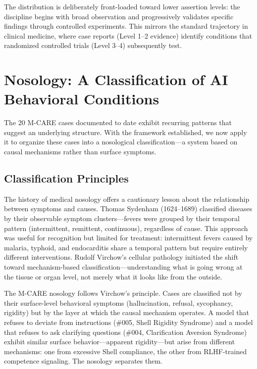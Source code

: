 \documentclass[11pt]{article}
\begin{document}
The distribution is deliberately front-loaded toward lower assertion levels: the discipline begins with broad observation and progressively validates specific findings through controlled experiments. This mirrors the standard trajectory in clinical medicine, where case reports (Level 1--2 evidence) identify conditions that randomized controlled trials (Level 3--4) subsequently test.

\section{Nosology: A Classification of AI Behavioral Conditions}

The 20 M-CARE cases documented to date exhibit recurring patterns that suggest an underlying structure. With the framework established, we now apply it to organize these cases into a nosological classification---a system based on causal mechanisms rather than surface symptoms.

\subsection{Classification Principles}

The history of medical nosology offers a cautionary lesson about the relationship between symptoms and causes. Thomas Sydenham (1624--1689) classified diseases by their observable symptom clusters---fevers were grouped by their temporal pattern (intermittent, remittent, continuous), regardless of cause. This approach was useful for recognition but limited for treatment: intermittent fevers caused by malaria, typhoid, and endocarditis share a temporal pattern but require entirely different interventions. Rudolf Virchow's cellular pathology \citep{Virchow1858} initiated the shift toward mechanism-based classification---understanding what is going wrong at the tissue or organ level, not merely what it looks like from the outside.

The M-CARE nosology follows Virchow's principle. Cases are classified not by their surface-level behavioral symptoms (hallucination, refusal, sycophancy, rigidity) but by the layer at which the causal mechanism operates. A model that refuses to deviate from instructions (\#005, Shell Rigidity Syndrome) and a model that refuses to ask clarifying questions (\#004, Clarification Aversion Syndrome) exhibit similar surface behavior---apparent rigidity---but arise from different mechanisms: one from excessive Shell compliance, the other from RLHF-trained competence signaling. The nosology separates them.
\end{document}
